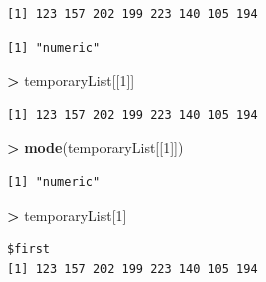 \documentclass[]{krantz}
\makeatletter
\newenvironment{Shaded}{\begin{snugshade}}{\end{snugshade}}
\newcommand{\KeywordTok}[1]{\textcolor[rgb]{0.27,0.27,0.27}{\textbf{#1}}}
\newcommand{\DecValTok}[1]{\textcolor[rgb]{0.06,0.06,0.06}{#1}}
\newcommand{\StringTok}[1]{\textcolor[rgb]{0.5,0.5,0.5}{#1}}
\newcommand{\OperatorTok}[1]{\textcolor[rgb]{0.43,0.43,0.43}{\textbf{#1}}}
\newcommand{\NormalTok}[1]{#1}
\newenvironment{kframe}{%
\medskip{}
\setlength{\fboxsep}{.8em}
 \def\at@end@of@kframe{}%
 \ifinner\ifhmode%
  \def\at@end@of@kframe{\end{minipage}}%
  \begin{minipage}{\columnwidth}%
 \fi\fi%
 \def\FrameCommand##1{\hskip\@totalleftmargin \hskip-\fboxsep
 \colorbox{shadecolor}{##1}\hskip-\fboxsep
     \hskip-\linewidth \hskip-\@totalleftmargin \hskip\columnwidth}%
 \MakeFramed {\advance\hsize-\width
   \@totalleftmargin\z@ \linewidth\hsize
   \@setminipage}}%
 {\par\unskip\endMakeFramed%
 \at@end@of@kframe}
\renewenvironment{Shaded}{\begin{kframe}}{\end{kframe}}
\makeatother
\begin{document}
\begin{Shaded}
\end{Shaded}

\begin{verbatim}
[1] 123 157 202 199 223 140 105 194
\end{verbatim}

\begin{Shaded}
\end{Shaded}

\begin{verbatim}
[1] "numeric"
\end{verbatim}

\begin{Shaded}
\begin{Highlighting}[]
\OperatorTok{>}\StringTok{ }\NormalTok{temporaryList[[}\DecValTok{1}\NormalTok{]]}
\end{Highlighting}
\end{Shaded}

\begin{verbatim}
[1] 123 157 202 199 223 140 105 194
\end{verbatim}

\begin{Shaded}
\begin{Highlighting}[]
\OperatorTok{>}\StringTok{ }\KeywordTok{mode}\NormalTok{(temporaryList[[}\DecValTok{1}\NormalTok{]])}
\end{Highlighting}
\end{Shaded}

\begin{verbatim}
[1] "numeric"
\end{verbatim}

\begin{Shaded}
\begin{Highlighting}[]
\OperatorTok{>}\StringTok{ }\NormalTok{temporaryList[}\DecValTok{1}\NormalTok{]}
\end{Highlighting}
\end{Shaded}

\begin{verbatim}
$first
[1] 123 157 202 199 223 140 105 194
\end{verbatim}
\end{document}
